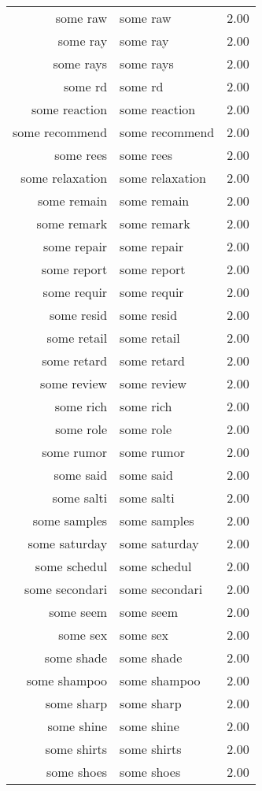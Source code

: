 \begin{table}[ht]
\begin{tabular}{rlr}
  some raw & some raw & 2.00 \\ 
  some ray & some ray & 2.00 \\ 
  some rays & some rays & 2.00 \\ 
  some rd & some rd & 2.00 \\ 
  some reaction & some reaction & 2.00 \\ 
  some recommend & some recommend & 2.00 \\ 
  some rees & some rees & 2.00 \\ 
  some relaxation & some relaxation & 2.00 \\ 
  some remain & some remain & 2.00 \\ 
  some remark & some remark & 2.00 \\ 
  some repair & some repair & 2.00 \\ 
  some report & some report & 2.00 \\ 
  some requir & some requir & 2.00 \\ 
  some resid & some resid & 2.00 \\ 
  some retail & some retail & 2.00 \\ 
  some retard & some retard & 2.00 \\ 
  some review & some review & 2.00 \\ 
  some rich & some rich & 2.00 \\ 
  some role & some role & 2.00 \\ 
  some rumor & some rumor & 2.00 \\ 
  some said & some said & 2.00 \\ 
  some salti & some salti & 2.00 \\ 
  some samples & some samples & 2.00 \\ 
  some saturday & some saturday & 2.00 \\ 
  some schedul & some schedul & 2.00 \\ 
  some secondari & some secondari & 2.00 \\ 
  some seem & some seem & 2.00 \\ 
  some sex & some sex & 2.00 \\ 
  some shade & some shade & 2.00 \\ 
  some shampoo & some shampoo & 2.00 \\ 
  some sharp & some sharp & 2.00 \\ 
  some shine & some shine & 2.00 \\ 
  some shirts & some shirts & 2.00 \\ 
  some shoes & some shoes & 2.00 \\ 

\end{tabular}
\end{table}
